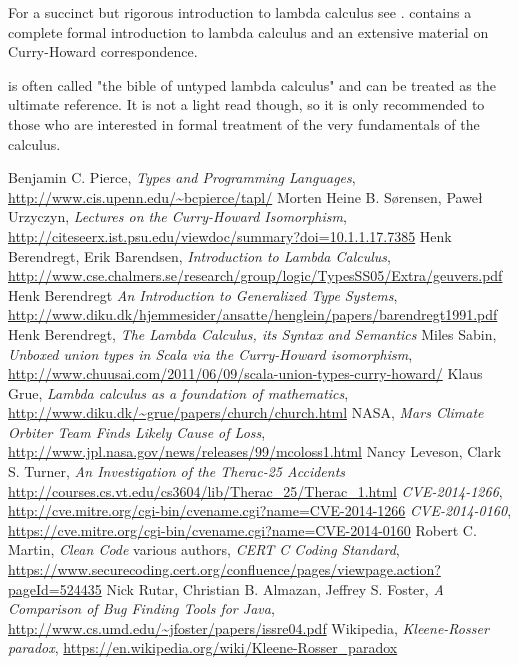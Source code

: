 \documentclass[11pt,twoside,a4paper]{article} %
\begin{document}
For a succinct but rigorous introduction to lambda calculus see \cite{bb00}.
\cite{su99} contains a complete formal introduction to lambda calculus and an
extensive material on Curry-Howard correspondence.

\cite{LCSS} is often called "the bible of untyped lambda calculus" and can be
treated as the ultimate reference. It is not a light read though, so it is only
recommended to those who are interested in formal treatment of the very
fundamentals of the calculus.

\begin{thebibliography}{9}
 Benjamin C. Pierce, \emph{Types and Programming Languages},
\url{http://www.cis.upenn.edu/~bcpierce/tapl/}
 Morten Heine B. Sørensen, Paweł Urzyczyn, \emph{Lectures on the
Curry-Howard Isomorphism}, 
\url{http://citeseerx.ist.psu.edu/viewdoc/summary?doi=10.1.1.17.7385}
 Henk Berendregt, Erik Barendsen, \emph{Introduction to Lambda
Calculus}, 
\url{http://www.cse.chalmers.se/research/group/logic/TypesSS05/Extra/geuvers.pdf}
 Henk Berendregt \emph{An Introduction to Generalized Type Systems}, 
\url{http://www.diku.dk/hjemmesider/ansatte/henglein/papers/barendregt1991.pdf}
 Henk Berendregt, \emph{The Lambda Calculus, its Syntax and
Semantics}
 Miles Sabin, \emph{Unboxed union types in Scala via the
Curry-Howard isomorphism}, 
\url{http://www.chuusai.com/2011/06/09/scala-union-types-curry-howard/}
 Klaus Grue, \emph{Lambda calculus as a foundation of mathematics},
\url{http://www.diku.dk/~grue/papers/church/church.html}
 NASA, \emph{Mars Climate Orbiter Team Finds Likely Cause of Loss}, 
\url{http://www.jpl.nasa.gov/news/releases/99/mcoloss1.html}
 Nancy Leveson, Clark S. Turner, 
\emph{An Investigation of the Therac-25 Accidents}
\url{http://courses.cs.vt.edu/cs3604/lib/Therac_25/Therac_1.html}
 \emph{CVE-2014-1266},
\url{http://cve.mitre.org/cgi-bin/cvename.cgi?name=CVE-2014-1266}
 \emph{CVE-2014-0160}, 
\url{https://cve.mitre.org/cgi-bin/cvename.cgi?name=CVE-2014-0160}
 Robert C. Martin, \emph{Clean Code}
 various authors, \emph{CERT C Coding Standard}, 
\url{https://www.securecoding.cert.org/confluence/pages/viewpage.action?pageId=524435}
 Nick Rutar, Christian B. Almazan, Jeffrey S. Foster, \emph{A
Comparison of Bug Finding Tools for Java}, 
\url{http://www.cs.umd.edu/~jfoster/papers/issre04.pdf}
 Wikipedia, \emph{Kleene-Rosser paradox},
\url{https://en.wikipedia.org/wiki/Kleene-Rosser_paradox}
\end{thebibliography}
\end{document}

